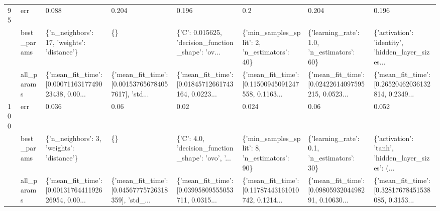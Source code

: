 \begin{tabular}{llllllll}
95  & err &                                              0.088 &                                              0.204 &                                              0.196 &                                                0.2 &                                              0.204 &                                              0.196 \\
    & best\_params &         \{'n\_neighbors': 17, 'weights': 'distance'\} &                                                 \{\} &  \{'C': 0.015625, 'decision\_function\_shape': 'ov... &       \{'min\_samples\_split': 2, 'n\_estimators': 40\} &         \{'learning\_rate': 1.0, 'n\_estimators': 60\} &  \{'activation': 'identity', 'hidden\_layer\_sizes... \\
    & all\_params &  \{'mean\_fit\_time': [0.0007116317749023438, 0.00... &  \{'mean\_fit\_time': [0.001537656784057617], 'std... &  \{'mean\_fit\_time': [0.01845712661743164, 0.0223... &  \{'mean\_fit\_time': [0.11500945091247558, 0.1163... &  \{'mean\_fit\_time': [0.02422614097595215, 0.0523... &  \{'mean\_fit\_time': [0.26520462036132814, 0.2349... \\
100 & err &                                              0.036 &                                               0.06 &                                               0.02 &                                              0.024 &                                               0.06 &                                              0.052 \\
    & best\_params &          \{'n\_neighbors': 3, 'weights': 'distance'\} &                                                 \{\} &  \{'C': 4.0, 'decision\_function\_shape': 'ovo', '... &       \{'min\_samples\_split': 8, 'n\_estimators': 90\} &         \{'learning\_rate': 0.1, 'n\_estimators': 30\} &  \{'activation': 'tanh', 'hidden\_layer\_sizes': (... \\
    & all\_params &  \{'mean\_fit\_time': [0.0013176441192626954, 0.00... &  \{'mean\_fit\_time': [0.04567775726318359], 'std\_... &  \{'mean\_fit\_time': [0.03995809555053711, 0.0315... &  \{'mean\_fit\_time': [0.11787443161010742, 0.1214... &  \{'mean\_fit\_time': [0.0980593204498291, 0.10630... &  \{'mean\_fit\_time': [0.32817678451538085, 0.3153... \\
\bottomrule
\end{tabular}
